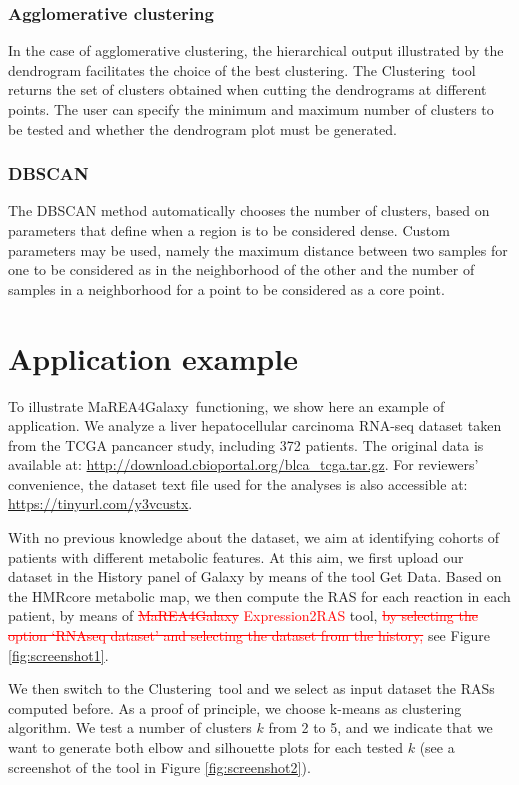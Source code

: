 \documentclass[preprint,12pt,authoryear]{elsarticle}
\newcommand{\red}{\textcolor{red}}
\newcommand{\mareagalaxy}{\textsf{MaREA4Galaxy}}
\newcommand{\clusterTool}{\textsf{Clustering}}
\newcommand{\RASTool}{\textsf{Expression2RAS}}
\begin{document}
\subsubsection{Agglomerative clustering}

In the case of agglomerative clustering, the hierarchical output
illustrated by the dendrogram facilitates the choice of the best
clustering. The \clusterTool\ tool returns the set of clusters
obtained when cutting the dendrograms at different points.
%
The user can specify the minimum and maximum number of clusters to be
tested and whether the dendrogram plot must be generated.


\subsubsection{DBSCAN}

The DBSCAN method automatically chooses the number of clusters, based
on parameters that define when a region is to be considered
dense. Custom parameters may be used, namely the maximum distance
between two samples for one to be considered as in the neighborhood of
the other and the number of samples in a neighborhood for a point to
be considered as a core point.


\section{Application example}

To illustrate \mareagalaxy\ functioning, we show here an example of application.
We analyze a liver hepatocellular carcinoma RNA-seq dataset taken from
the TCGA pancancer study, including 372 patients.
%
The original data is available at:
\url{http://download.cbioportal.org/blca\_tcga.tar.gz}.
%
For reviewers' convenience, the dataset text file used for the
analyses is also accessible at: \url{https://tinyurl.com/y3vcustx}.

With no previous knowledge about the dataset, we aim at identifying
cohorts of patients with different metabolic features.
%
At this aim, we first upload our dataset in the History panel of
Galaxy by means of the tool Get Data. Based on the HMRcore metabolic
map, we then compute the RAS for each reaction in each patient, by
means of \red{\sout{\mareagalaxy} \RASTool} tool, \red{\sout{by
    selecting the option `RNAseq dataset' and selecting the dataset
    from the history,}} see Figure \ref{fig:screenshot1}.

We then switch to the \clusterTool\ tool and we select as input
dataset the RASs computed before. As a proof of principle, we choose
k-means as clustering algorithm. We test a number of clusters $k$ from
2 to 5, and we indicate that we want to generate both elbow and
silhouette plots for each tested $k$ (see a screenshot of the tool in
Figure \ref{fig:screenshot2}).
\end{document}
